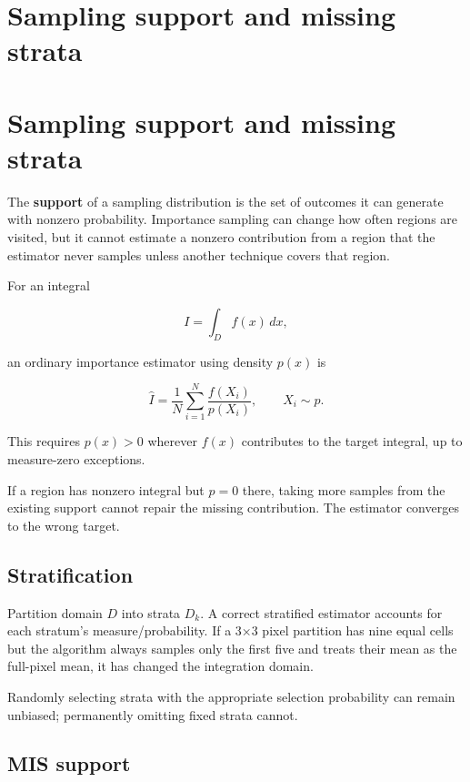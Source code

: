 \hypertarget{appendix-10308c3d753e}{}
\section*{Sampling support and missing strata}
\section{Sampling support and missing strata}\label{sampling-support-and-missing-strata}

The \textbf{support} of a sampling distribution is the set of outcomes it can generate with nonzero probability. Importance sampling can change how often regions are visited, but it cannot estimate a nonzero contribution from a region that the estimator never samples unless another technique covers that region.

For an integral

\[
I=\int_D f(x)\,dx,
\]

an ordinary importance estimator using density \(p(x)\) is

\[
\hat I=\frac1N\sum_{i=1}^N\frac{f(X_i)}{p(X_i)},
\qquad X_i\sim p.
\]

This requires \(p(x)>0\) wherever \(f(x)\) contributes to the target integral, up to measure-zero exceptions.

If a region has nonzero integral but \(p=0\) there, taking more samples from the existing support cannot repair the missing contribution. The estimator converges to the wrong target.

\subsection{Stratification}\label{stratification}

Partition domain \(D\) into strata \(D_k\). A correct stratified estimator accounts for each stratum's measure/probability. If a 3×3 pixel partition has nine equal cells but the algorithm always samples only the first five and treats their mean as the full-pixel mean, it has changed the integration domain.

Randomly selecting strata with the appropriate selection probability can remain unbiased; permanently omitting fixed strata cannot.

\subsection{MIS support}\label{mis-support}

